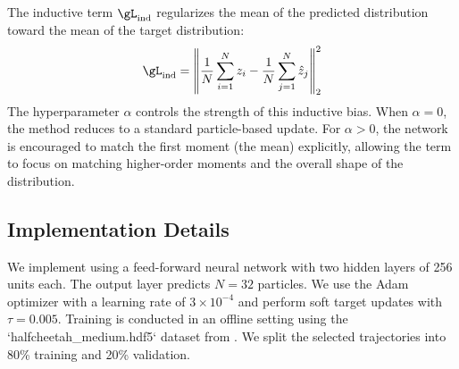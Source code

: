 The inductive term $\gL_{\text{ind}}$ regularizes the mean of the predicted distribution toward the mean of the target distribution:
\begin{equation}
\gL_{\text{ind}} = \left\| \frac{1}{N} \sum_{i=1}^N z_i - \frac{1}{N} \sum_{j=1}^N \hat{z}_j \right\|^2_2
\end{equation}
The hyperparameter $\alpha$ controls the strength of this inductive bias. When $\alpha=0$, the method reduces to a standard particle-based \mmd update. For $\alpha > 0$, the network is encouraged to match the first moment (the mean) explicitly, allowing the \mmd term to focus on matching higher-order moments and the overall shape of the distribution.

\subsection{Implementation Details}
We implement \immq using a feed-forward neural network with two hidden layers of 256 units each. The output layer predicts $N=32$ particles. We use the Adam optimizer with a learning rate of $3 \times 10^{-4}$ and perform soft target updates with $\tau = 0.005$. Training is conducted in an offline setting using the `halfcheetah_medium.hdf5` dataset from \dfourrl \cite{fu2020d4rl}. We split the selected trajectories into 80\% training and 20\% validation.
